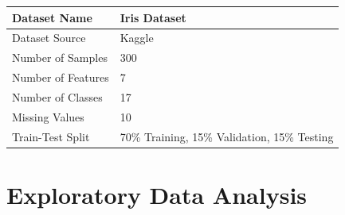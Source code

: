 \documentclass[12pt,a4paper]{article}
\begin{document}
\begin{longtable}{|p{6cm}|p{8cm}|}
\hline
Dataset Name & Iris Dataset\\ \hline
Dataset Source & Kaggle\\ \hline
Number of Samples & 300\\ \hline
Number of Features & 7\\ \hline
Number of Classes &   17\\ \hline
Missing Values & 10\\ \hline
Train-Test Split & 70\% Training, 15\% Validation, 15\% Testing \\ \hline
\end{longtable}

\section{Exploratory Data Analysis}
\end{document}

